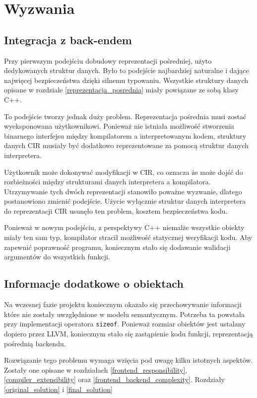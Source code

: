 \section{Wyzwania}
\subsection{Integracja z back-endem}
Przy pierwszym podejściu dobudowy reprezentacji pośredniej, użyto dedykowanych struktur danych. Było to podejście najbardziej naturalne i dające najwięcej bezpieczeństwa dzięki silnemu typowaniu. Wszystkie struktury danych opisane w rozdziale \ref{reprezentacja_posrednia} miały powiązane ze sobą klasy C++.


To podejście tworzy jednak duży problem. Reprezentacja pośrednia musi zostać wyeksponowana użytkownikowi. Ponieważ nie istniała możliwość stworzenia binarnego interfejsu między kompilatorem a interpretowanym kodem, struktury danych CIR musiały być dodatkowo reprezentowane za pomocą struktur danych interpretera.


Użytkownik może dokonywać modyfikacji w CIR, co oznacza że może dojść do rozbieżności między strukturami danych interpretera a kompilatora. Utrzymywanie tych dwóch reprezentacji stanowiło poważne wyzwanie, dlatego postanowiono zmienić podejście. Użycie wyłącznie struktur danych interpretera do reprezentacji CIR usunęło ten problem, kosztem bezpieczeństwa kodu.


Ponieważ w nowym podejściu, z perspektywy C++ niemalże wszystkie obiekty miały ten sam typ, kompilator stracił możliwość statycznej weryfikacji kodu.
Aby zapewnić poprawność programu, koniecznym stało się dodawanie walidacji argumentów do wszystkich funkcji.

\subsection{Informacje dodatkowe o obiektach}
Na wczesnej fazie projektu koniecznym okazało się przechowywanie informacji które nie zostały uwzględnione w modelu semantycznym.
Potrzeba ta powstała przy implementacji operatora \texttt{sizeof}.
Ponieważ rozmiar obiektów jest ustalany dopiero przez LLVM, koniecznym stało się zastąpienie kodu funkcji, reprezentacją pośrednią backendu.

Rozwiązanie tego problemu wymaga wzięcia pod uwagę kilku istotnych aspektów.
Zostały one opisane w rozdziałach \ref{frontend_responsibility}, \ref{compiler_extensibility} oraz \ref{frontend_backend_complexity}.
Rozdziały \ref{original_solution} i \ref{final_solution}

